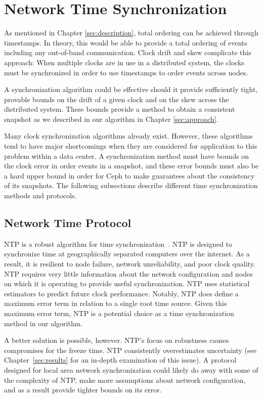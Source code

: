 \section{Network Time Synchronization}

As mentioned in Chapter \ref{sec:description}, total ordering can be
achieved through timestamps. In theory, this would be able to provide
a total ordering of events including any out-of-band
communication. Clock drift and skew complicate this approach: When
multiple clocks are in use in a distributed system, the clocks must be
synchronized in order to use timestamps to order events across nodes.

A synchronization algorithm could be effective should it provide
sufficiently tight, provable bounds on the drift of a given clock and
on the skew across the distributed system. These bounds provide a
method to obtain a consistent snapshot as we described in our
algorithm in Chapter \ref{sec:approach}.

Many clock synchronization algorithms already exist. However, these
algorithms tend to have major shortcomings when they are considered
for application to this problem within a data center. A
synchronization method must have bounds on the clock error in order
events in a snapshot, and these error bounds must also be a hard upper
bound in order for Ceph to make guarantees about the consistency of
its snapshots. The following subsections describe different time
synchronization methods and protocols.

\subsection{Network Time Protocol}

NTP is a robust algorithm for time
synchronization~\citep{Burbank2010}. NTP is designed to synchronize
time at geographically separated computers over the internet. As a
result, it is resilient to node failure, network unreliability, and
poor clock quality. NTP requires very little information about the
network configuration and nodes on which it is operating to provide
useful synchronization. NTP uses statistical estimators to predict
future clock performance. Notably, NTP does define a maximum error
term in relation to a single root time source. Given this maximum
error term, NTP is a potential choice as a time synchronization method
in our algorithm.

A better solution is possible, however. NTP's focus on robustness
causes compromises for the freeze time. NTP consistently overestimates
uncertainty (see Chapter~\ref{sec:results} for an in-depth examination
of this issue). A protocol designed for local area network
synchronization could likely do away with some of the complexity of
NTP, make more assumptions about network configuration, and as a
result provide tighter bounds on its error.

